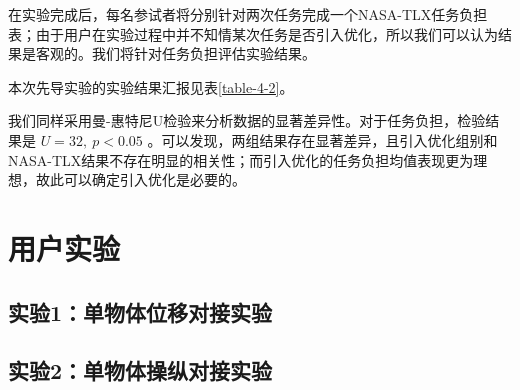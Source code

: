 在实验完成后，每名参试者将分别针对两次任务完成一个NASA-TLX任务负担表；由于用户在实验过程中并不知情某次任务是否引入优化，所以我们可以认为结果是客观的。我们将针对任务负担评估实验结果。

本次先导实验的实验结果汇报见表\ref{table-4-2}。

我们同样采用曼-惠特尼U检验来分析数据的显著差异性。对于任务负担，检验结果是 $U = 32,\ p < 0.05$ 。可以发现，两组结果存在显著差异，且引入优化组别和NASA-TLX结果不存在明显的相关性；而引入优化的任务负担均值表现更为理想，故此可以确定引入优化是必要的。

\section{用户实验}

\subsection{实验1：单物体位移对接实验}

\subsection{实验2：单物体操纵对接实验}
